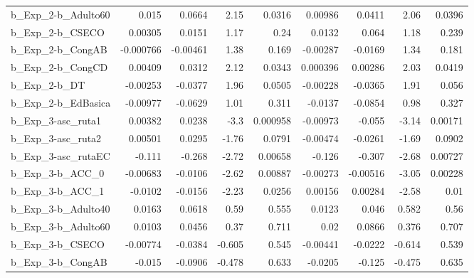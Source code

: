 \begin{tabular}{lrrrrrrrr}
b\_Exp\_2-b\_Adulto60         &       0.015 &       0.0664 &      2.15 &   0.0316 &    0.00986 &      0.0411 &         2.06 &        0.0396 \\
b\_Exp\_2-b\_CSECO            &     0.00305 &       0.0151 &      1.17 &     0.24 &     0.0132 &       0.064 &         1.18 &         0.239 \\
b\_Exp\_2-b\_CongAB           &   -0.000766 &     -0.00461 &      1.38 &    0.169 &   -0.00287 &     -0.0169 &         1.34 &         0.181 \\
b\_Exp\_2-b\_CongCD           &     0.00409 &       0.0312 &      2.12 &   0.0343 &   0.000396 &     0.00286 &         2.03 &        0.0419 \\
b\_Exp\_2-b\_DT               &    -0.00253 &      -0.0377 &      1.96 &   0.0505 &   -0.00228 &     -0.0365 &         1.91 &         0.056 \\
b\_Exp\_2-b\_EdBasica         &    -0.00977 &      -0.0629 &      1.01 &    0.311 &    -0.0137 &     -0.0854 &         0.98 &         0.327 \\
b\_Exp\_3-asc\_ruta1          &     0.00382 &       0.0238 &      -3.3 & 0.000958 &   -0.00973 &      -0.055 &        -3.14 &       0.00171 \\
b\_Exp\_3-asc\_ruta2          &     0.00501 &       0.0295 &     -1.76 &   0.0791 &   -0.00474 &     -0.0261 &        -1.69 &        0.0902 \\
b\_Exp\_3-asc\_rutaEC         &      -0.111 &       -0.268 &     -2.72 &  0.00658 &     -0.126 &      -0.307 &        -2.68 &       0.00727 \\
b\_Exp\_3-b\_ACC\_0            &    -0.00683 &      -0.0106 &     -2.62 &  0.00887 &   -0.00273 &    -0.00516 &        -3.05 &       0.00228 \\
b\_Exp\_3-b\_ACC\_1            &     -0.0102 &      -0.0156 &     -2.23 &   0.0256 &    0.00156 &     0.00284 &        -2.58 &          0.01 \\
b\_Exp\_3-b\_Adulto40         &      0.0163 &       0.0618 &      0.59 &    0.555 &     0.0123 &       0.046 &        0.582 &          0.56 \\
b\_Exp\_3-b\_Adulto60         &      0.0103 &       0.0456 &      0.37 &    0.711 &       0.02 &      0.0866 &        0.376 &         0.707 \\
b\_Exp\_3-b\_CSECO            &    -0.00774 &      -0.0384 &    -0.605 &    0.545 &   -0.00441 &     -0.0222 &       -0.614 &         0.539 \\
b\_Exp\_3-b\_CongAB           &      -0.015 &      -0.0906 &    -0.478 &    0.633 &    -0.0205 &      -0.125 &       -0.475 &         0.635 \\

\end{tabular}
